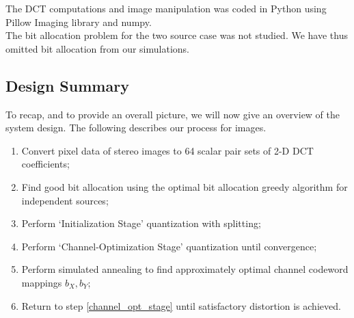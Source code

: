 \documentclass[10pt]{article}
\begin{document}
The DCT computations and image manipulation was coded in Python using Pillow Imaging library and numpy.\\

The bit allocation problem for the two source case was not studied. We have thus omitted bit allocation from our simulations.


\subsection{Design Summary}
To recap, and to provide an overall picture, we will now give an overview of the system design. The following describes our process for images.\\

\begin{enumerate}
    \item Convert pixel data of stereo images to 64 scalar pair sets of 2-D DCT coefficients;
    \item Find good bit allocation using the optimal bit allocation greedy algorithm for independent sources;
    \item Perform `Initialization Stage' quantization with splitting;
    \item \label{channel_opt_stage}
    Perform `Channel-Optimization Stage' quantization until convergence;
    \item Perform simulated annealing to find approximately optimal channel codeword mappings $b_X, b_Y$;
    \item Return to step \ref{channel_opt_stage} until satisfactory distortion is achieved.
\end{enumerate}

\end{document}
